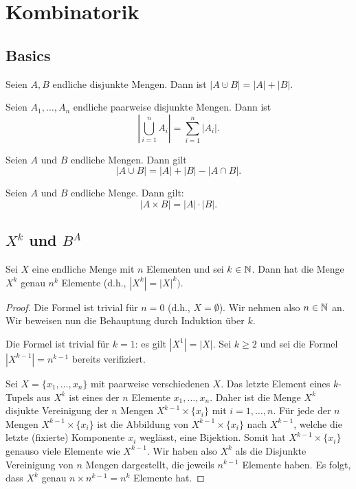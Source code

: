 \chapter{Kombinatorik} 

\section{Basics} 

\begin{lem}
	Seien $A, B$ endliche disjunkte Mengen. Dann ist $|A \cupdot B| = |A| + |B|$. 
\end{lem} 

\begin{lem}
	Seien $A_1,\ldots,A_n$ endliche paarweise disjunkte Mengen. Dann ist 
	\[
		\left| \bigcup_{i=1}^n A_i \right| = \sum_{i=1}^n |A_i|. 
	\]
\end{lem} 

\begin{lem}
	Seien $A$ und $B$ endliche Mengen. Dann gilt 
	\[
		|A \cup B| = |A| + |B| - |A \cap B|. 
	\]
\end{lem}

\begin{lem}
	Seien $A$ und $B$ endliche Menge. Dann gilt: 
	\[
		|A \times B| = |A| \cdot |B|. 
	\]
\end{lem}
 

\section{$X^k$ und $B^A$} 


\begin{thm}
	Sei $X$ eine endliche Menge mit $n$ Elementen und sei $k \in \mathbb{N}$. Dann hat die Menge $X^k$ genau $n^k$ Elemente (d.h., $|X^k| = |X|^k)$. 
\end{thm} 
\begin{proof} 
	Die Formel ist trivial für $n=0$ (d.h., $X = \emptyset$). Wir nehmen also $n \in \mathbb{N}$ an. Wir beweisen nun die Behauptung durch Induktion über $k$. 
	
	Die Formel ist trivial für $k = 1$: es gilt $|X^1| = |X|$. Sei $k \ge 2$ und sei die Formel $|X^{k-1}| = n^{k-1}$ bereits verifiziert. 
	
	Sei $X = \{x_1,\ldots,x_n\}$ mit paarweise verschiedenen $X$. Das letzte Element eines $k$-Tupels aus $X^k$ ist eines der $n$ Elemente $x_1,\ldots,x_n$. Daher ist die Menge $X^k$ disjukte Vereinigung der $n$ Mengen 
	$X^{k-1} \times \{x_i\}$
	mit $i=1,\ldots,n$. Für jede der $n$ Mengen $X^{k-1} \times \{x_i\}$ ist die Abbildung von $X^{k-1} \times \{x_i\}$ nach $X^{k-1}$, welche die letzte (fixierte) Komponente $x_i$ weglässt, eine Bijektion. Somit hat $X^{k-1} \times \{x_i\}$ genauso viele Elemente wie $X^{k-1}$. Wir haben also $X^k$ als die Disjunkte Vereinigung von $n$ Mengen dargestellt, die jeweils $n^{k-1}$ Elemente haben. Es folgt, dass $X^k$ genau $n \times n^{k-1} = n^k$ Elemente hat. 
\end{proof} 

